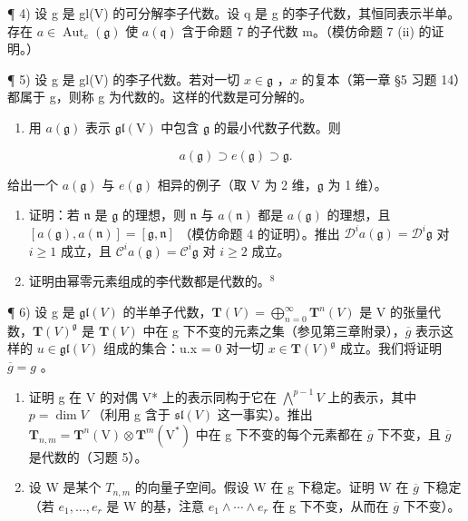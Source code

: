 ¶ 4) 设 g 是 gl(V) 的可分解李子代数。设 q 是 g 的李子代数，其恒同表示半单。存在 \(a \in \operatorname{Aut}_{e}(\mathfrak{g})\) 使 \(a(\mathfrak{q})\) 含于命题 7 的子代数 m。（模仿命题 7 (ii) 的证明。）

¶ 5) 设 g 是 gl(V) 的李子代数。若对一切 \(x \in \mathfrak{g}\) ，\(x\) 的复本（第一章 §5 习题 14）都属于 g，则称 g 为代数的。这样的代数是可分解的。

\begin{enumerate}
\def\labelenumi{\alph{enumi})}
\tightlist
\item
  用 \(a(\mathfrak{g})\) 表示 \(\mathfrak{gl}(\mathrm{V})\) 中包含 \(\mathfrak{g}\) 的最小代数子代数。则
\end{enumerate}

\[
a (\mathfrak {g}) \supset e (\mathfrak {g}) \supset \mathfrak {g}.
\]

给出一个 \(a(\mathfrak{g})\) 与 \(e(\mathfrak{g})\) 相异的例子（取 V 为 2 维，\(\mathfrak{g}\) 为 1 维）。

\begin{enumerate}
\def\labelenumi{\alph{enumi})}
\setcounter{enumi}{1}
\item
  证明：若 \(\mathfrak{n}\) 是 \(\mathfrak{g}\) 的理想，则 \(\mathfrak{n}\) 与 \(a(\mathfrak{n})\) 都是 \(a(\mathfrak{g})\) 的理想，且 \([a(\mathfrak{g}), a(\mathfrak{n})] = [\mathfrak{g}, \mathfrak{n}]\) （模仿命题 4 的证明）。推出 \(\mathcal{D}^i a(\mathfrak{g}) = \mathcal{D}^i \mathfrak{g}\) 对 \(i \geq 1\) 成立，且 \(\mathcal{C}^i a(\mathfrak{g}) = \mathcal{C}^i \mathfrak{g}\) 对 \(i \geq 2\) 成立。
\item
  证明由幂零元素组成的李代数都是代数的。\(^{8}\)
\end{enumerate}

¶ 6) 设 g 是 \(\mathfrak{gl}(V)\) 的半单子代数，\(\mathbf{T}(V) = \bigoplus_{n=0}^{\infty} \mathbf{T}^{n}(V)\) 是 V 的张量代数，\(\mathbf{T}(V)^{\mathfrak{g}}\) 是 \(\mathbf{T}(V)\) 中在 g 下不变的元素之集（参见第三章附录），\(\overline{g}\) 表示这样的 \(u \in \mathfrak{gl}(V)\) 组成的集合：u.x = 0 对一切 \(x \in \mathbf{T}(V)^{\mathfrak{g}}\) 成立。我们将证明 \(\overline{g} = g\) 。

\begin{enumerate}
\def\labelenumi{\alph{enumi})}
\item
  证明 g 在 V 的对偶 V* 上的表示同构于它在 \(\bigwedge^{p-1}V\) 上的表示，其中 \(p = \dim V\) （利用 g 含于 \(\mathfrak{sl}(V)\) 这一事实）。推出 \(\mathbf{T}_{n,m} = \mathbf{T}^{n}(\mathrm{V}) \otimes \mathbf{T}^{m}(\mathrm{V}^{*})\) 中在 g 下不变的每个元素都在 \(\overline{g}\) 下不变，且 \(\overline{g}\) 是代数的（习题 5）。
\item
  设 W 是某个 \(T_{n,m}\) 的向量子空间。假设 W 在 g 下稳定。证明 W 在 \(\overline{g}\) 下稳定（若 \(e_{1},\ldots,e_{r}\) 是 W 的基，注意 \(e_{1}\wedge\cdots\wedge e_{r}\) 在 g 下不变，从而在 \(\overline{g}\) 下不变）。
\end{enumerate}

